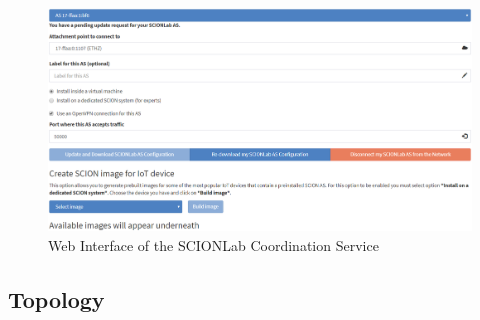 \begin{figure}[h]
	\centering
	\includegraphics[width=\textwidth]{img/SCIONLab_Coordination_Service.png}
	\caption{Web Interface of the SCIONLab Coordination Service }
\end{figure}

\subsection{Topology}
